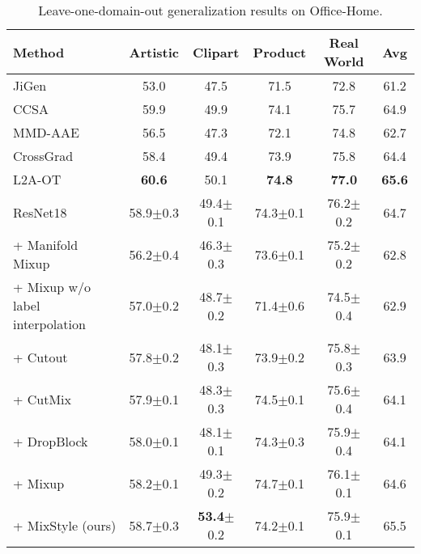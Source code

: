 \documentclass{article} \usepackage{iclr2021_conference,times}
\newcommand{\tableCellHeight}{1}
\newcommand{\tabstyle}[1]{
  \setlength{\tabcolsep}{#1}
  \renewcommand{\arraystretch}{\tableCellHeight}
  \centering
}
\begin{document}
\begin{table}[t]
\tabstyle{6pt}
\caption{Leave-one-domain-out generalization results on Office-Home.}
\label{tab:result_office_home}
\begin{tabular}{l | c c c c | c}
\hline
Method & Artistic & Clipart & Product & Real World & Avg \\
\hline \hline
JiGen & 53.0 & 47.5 & 71.5 & 72.8 & 61.2 \\
CCSA & 59.9 & 49.9 & 74.1 & 75.7 & 64.9 \\
MMD-AAE & 56.5 & 47.3 & 72.1 & 74.8 & 62.7 \\
CrossGrad & 58.4 & 49.4 & 73.9 & 75.8 & 64.4 \\
L2A-OT & \textbf{60.6} & 50.1 & \textbf{74.8} & \textbf{77.0} & \textbf{65.6} \\
\hline
ResNet18 & 58.9$\pm$0.3 & 49.4$\pm$0.1 & 74.3$\pm$0.1 & 76.2$\pm$0.2 & 64.7 \\
+ Manifold Mixup & 56.2$\pm$0.4 & 46.3$\pm$0.3 & 73.6$\pm$0.1 & 75.2$\pm$0.2 & 62.8 \\
+ Mixup w/o label interpolation & 57.0$\pm$0.2 & 48.7$\pm$0.2 & 71.4$\pm$0.6 & 74.5$\pm$0.4 & 62.9 \\
+ Cutout & 57.8$\pm$0.2 & 48.1$\pm$0.3 & 73.9$\pm$0.2 & 75.8$\pm$0.3 & 63.9 \\
+ CutMix & 57.9$\pm$0.1 & 48.3$\pm$0.3 & 74.5$\pm$0.1 & 75.6$\pm$0.4 & 64.1 \\
+ DropBlock & 58.0$\pm$0.1 & 48.1$\pm$0.1 & 74.3$\pm$0.3 & 75.9$\pm$0.4 & 64.1 \\
+ Mixup & 58.2$\pm$0.1 & 49.3$\pm$0.2 & 74.7$\pm$0.1 & 76.1$\pm$0.1 & 64.6  \\
+ MixStyle (ours) & 58.7$\pm$0.3 & \textbf{53.4}$\pm$0.2 & 74.2$\pm$0.1 & 75.9$\pm$0.1 & 65.5 \\
\hline
\end{tabular}
\end{table}
\end{document}
